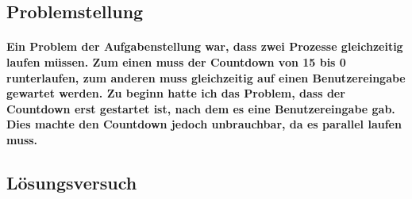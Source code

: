 \documentclass{article}
\begin{document}
\subsection{Problemstellung}
\paragraph{Ein Problem der Aufgabenstellung war, dass zwei Prozesse gleichzeitig laufen müssen. Zum einen muss der Countdown von 15 bis 0 runterlaufen, zum anderen muss gleichzeitig auf einen Benutzereingabe gewartet werden. Zu beginn hatte ich das Problem, dass der Countdown erst gestartet ist, nach dem es eine Benutzereingabe gab. Dies machte den Countdown jedoch unbrauchbar, da es parallel laufen muss.}
\subsection{Lösungsversuch}
\end{document}
